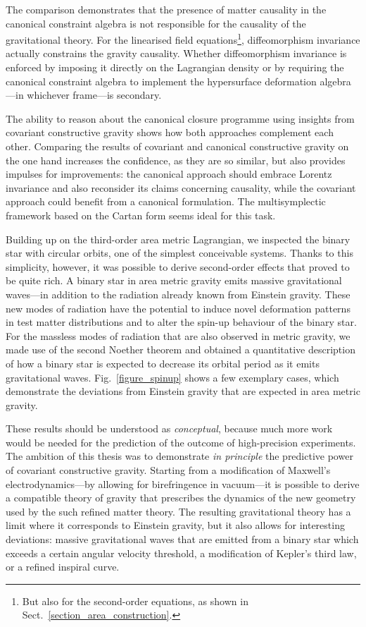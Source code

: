 The comparison demonstrates that the presence of matter causality in the canonical constraint algebra is not responsible for the causality of the gravitational theory. For the linearised field equations\footnote{But also for the second-order equations, as shown in Sect.~\ref{section_area_construction}.}, diffeomorphism invariance actually constrains the gravity causality. Whether diffeomorphism invariance is enforced by imposing it directly on the Lagrangian density or by requiring the canonical constraint algebra to implement the hypersurface deformation algebra---in whichever frame---is secondary.

The ability to reason about the canonical closure programme using insights from covariant constructive gravity shows how both approaches complement each other. Comparing the results of covariant and canonical constructive gravity on the one hand increases the confidence, as they are so similar, but also provides impulses for improvements: the canonical approach should embrace Lorentz invariance and also reconsider its claims concerning causality, while the covariant approach could benefit from a canonical formulation. The multisymplectic framework based on the Cartan form \cite{Gotay_1991} seems ideal for this task.

Building up on the third-order area metric Lagrangian, we inspected the binary star with circular orbits, one of the simplest conceivable systems. Thanks to this simplicity, however, it was possible to derive second-order effects that proved to be quite rich. A binary star in area metric gravity emits massive gravitational waves---in addition to the radiation already known from Einstein gravity. These new modes of radiation have the potential to induce novel deformation patterns in test matter distributions and to alter the spin-up behaviour of the binary star. For the massless modes of radiation that are also observed in metric gravity, we made use of the second Noether theorem and obtained a quantitative description of how a binary star is expected to decrease its orbital period as it emits gravitational waves. Fig.~\ref{figure_spinup} shows a few exemplary cases, which demonstrate the deviations from Einstein gravity that are expected in area metric gravity.

These results should be understood as \emph{conceptual}, because much more work would be needed for the prediction of the outcome of high-precision experiments. The ambition of this thesis was to demonstrate \emph{in principle} the predictive power of covariant constructive gravity. Starting from a modification of Maxwell's electrodynamics---by allowing for birefringence in vacuum---it is possible to derive a compatible theory of gravity that prescribes the dynamics of the new geometry used by the such refined matter theory. The resulting gravitational theory has a limit where it corresponds to Einstein gravity, but it also allows for interesting deviations: massive gravitational waves that are emitted from a binary star which exceeds a certain angular velocity threshold, a modification of Kepler's third law, or a refined inspiral curve.


